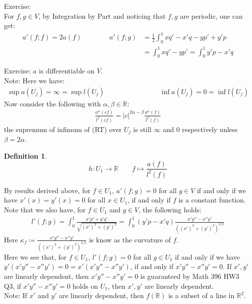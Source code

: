 \documentclass[15pt]{book}
\theoremstyle{break}
\theoremstyle{break}
\newtheorem{defn}{Definition}[corL]
\newcommand{\R}{\mathbb{R}}
\newcommand{\lr}[1]{\left(#1\right)}
\newcommand{\note}{\color{red}Note: \color{black}}
\newcommand{\exercise}{\color{green}Exercise: \color{black}}
\begin{document}
\exercise \\
For $f,g \in V$, by Integration by Part and noticing that $f,g$ are periodic, one can get:
\begin{align*}
a'(f;f) = 2a(f) \qquad\qquad
a'(f;g) &= \frac{1}{2} \int_0^1 xq' - x'q - yp' + y' p \\
&= \int_0^1 xq' - yp' = \int_0^1 y'p - x'q 
\end{align*}

\exercise $a$ is differentiable on $V$. \\

\note Here we have:
\begin{align*}
\sup a(U_j) = \infty  = \sup l(U_j) \qquad\qquad\qquad\qquad \inf a(U_j) = 0 = \inf l(U_j)
\end{align*}
Now consider the following with $\alpha,\beta \in \R$:
\begin{align*}
\frac{a^\alpha (cf)}{l^\beta (cf)} = |c|^{2\alpha - \beta} \frac{a^\alpha(f)}{l^{\beta}(f)} \tag{RT}
\end{align*}
the supremum of infimum of (RT) over $U_j$ is still $\infty$ and $0$ respectively unless $\beta = 2\alpha$. \\

\begin{defn}
$$h:U_1 \to \R \qquad f \mapsto \frac{a(f)}{l^2(f)}$$
\end{defn}

\newpage
By results derived above, for $f \in U_1$, $a'(f;g) = 0$ for all $g \in V$ if and only if we have $x'(x) = y'(x) = 0$ for all $x \in U_1$, if and only if $f$ is a constant function. Note that we also have, for $f \in U_1$ and $g \in V$, the following holds:
\begin{align*}
l'(f;g) = \int_0^1 \frac{x'p'+y'q'}{\sqrt{(x')^2 + (y')^2}} = \int_0^1 (y'p - x'q) \frac{x'y'' - x'' y'}{\lr{(x')^2 + (y')^2}^{3/2}}
\end{align*}
Here $\kappa_f \coloneqq \frac{x'y'' - x'' y'}{\lr{(x')^2 + (y')^2}^{3/2}} $ is know as the curvature of $f$. \\

Here we see that, for $f \in U_1$, $l'(f;g) = 0$ for all $g \in U_1$ if and only if we have $y'(x'y''-x''y') = 0 = x'(x'y''-x''y')$, if and only if $x'y'' - x'' y' = 0$. If $x',y'$ are linearly dependent, then $x'y'' - x''y' = 0$ is guaranteed by Math 396 HW3 Q3, if $x'y'' - x''y' =0$ holds on $U_1$, then $x', y'$ are linearly dependent. \\

\note If $x'$ and $y'$ are linearly dependent, then $f(\R)$ is a subset of a line in $\R^2$. \\
\end{document}
